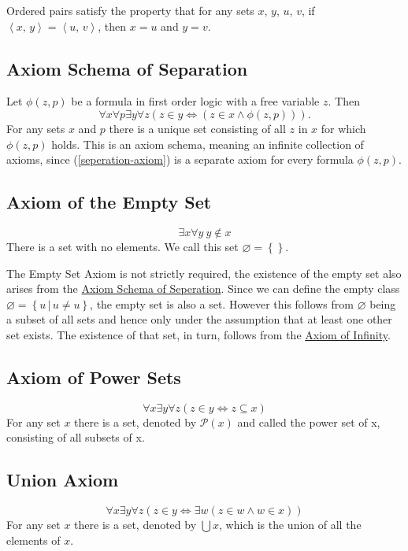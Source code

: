 \documentclass[../../main.tex]{subfiles}
\begin{document}
Ordered pairs satisfy the property that for any sets $x$, $y$, $u$, $v$, if $\left<x,\, y\right> = \left<u,\, v\right>$, then $x = u$ and $y = v$.\cite[Theorem 4.2, p.79]{Gol17}

\subsection{Axiom Schema of Separation}\label{ZF3}
Let $\phi(z, p)$ be a formula in first order logic with a free variable $z$. Then
\begin{equation}\label{seperation-axiom}
    \forall x \forall p \exists y \forall z \left(z \in y \iff \left(z \in x \wedge \phi(z, p)\right)\right).
\end{equation}
For any sets $x$ and $p$ there is a unique set consisting of all $z$ in $x$ for which $\phi(z, p)$ holds.
This is an axiom schema, meaning an infinite collection of axioms, since (\ref{seperation-axiom}) is a separate axiom for every formula $\phi(z, p)$.\cite[pp.5-6]{Jec78}

\subsection{Axiom of the Empty Set} 
$$\exists x \forall y \ y \notin x$$
There is a set with no elements. We call this set $\varnothing = \left\{\right\}$. \cite{Gol17}

The Empty Set Axiom is not strictly required, the existence of the empty set also arises from the \hyperref[ZF3]{Axiom Schema of Seperation}.
Since we can define the empty class $\varnothing = \left\{u\, \vert\, u \neq u\right\}$, the empty set is also a set.
However this follows from $\varnothing$ being a subset of all sets and hence only under the assumption that at least one other set exists.
The existence of that set, in turn, follows from the \hyperref[ZF7]{Axiom of Infinity}.\cite[p.6]{Jec78}

\subsection{Axiom of Power Sets}
$$\forall x \exists y \forall z \left(z \in y \iff z \subseteq x\right)$$
For any set $x$ there is a set, denoted by $\mathcal{P}(x)$ and called the power set of x, consisting of all subsets of x.

\subsection{Union Axiom}
$$\forall x \exists y \forall z \left(z \in y \iff \exists w \left(z \in w \wedge w \in x\right)\right)$$
For any set $x$ there is a set, denoted by $\bigcup x$, which is the union of all the elements of $x$.
\end{document}
